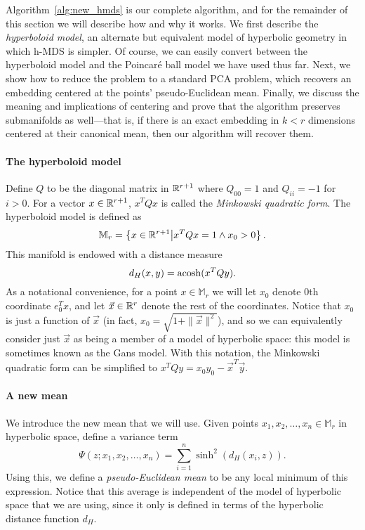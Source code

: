 Algorithm~\ref{alg:new_hmds} is our complete algorithm, and for the remainder of
this section we will describe how and why it works.
We first describe the \emph{hyperboloid model}, an alternate but equivalent model of hyperbolic geometry in which h-MDS is simpler. Of course, we can easily convert between the hyperboloid model and the Poincar\'{e} ball model we have used thus far.
Next, we show how to reduce the problem to a standard PCA problem, which recovers an embedding centered at the points' pseudo-Euclidean mean.
Finally, we discuss the meaning and implications of centering and prove that the algorithm preserves submanifolds as well---that is, if there is an exact embedding in $k < r$ dimensions centered at their canonical mean,
then our algorithm will recover them.

\paragraph*{The hyperboloid model}
Define $Q$ to be the diagonal matrix in $\mathbb{R}^{r+1}$ where $Q_{00} = 1$ and $Q_{ii} = -1$ for $i > 0$.
For a vector $x \in \mathbb{R}^{r+1}$, $x^TQx$ is called the \emph{Minkowski quadratic form}.
The hyperboloid model is defined as
\[
  \mathbb{M}_r = \left\{ x \in \mathbb{R}^{r+1} \middle| x^T Q x = 1 \land x_0 > 0 \right\}.
\]
This manifold is endowed with a distance measure
\[
  d_H(x, y) = \operatorname{acosh}(x^T Q y).
\]
As a notational convenience, for a point $x \in \mathbb{M}_r$ we will let $x_0$ denote $0$th coordinate $e_0^T x$, and let $\vec x \in \mathbb{R}^r$ denote the rest of the coordinates.
Notice that $x_0$ is just a function of $\vec x$ (in fact, $x_0 = \sqrt{1 + \| \vec{x} \|^2}$), and so we can equivalently consider just $\vec x$ as being a member of a model of hyperbolic space: this model is sometimes known as the Gans model.
With this notation, the Minkowski quadratic form can be simplified to $x^T Q y = x_0 y_0 - \vec{x}^T \vec{y}$.

\paragraph*{A new mean}
We introduce the new mean that we will use.
Given points $x_1, x_2, \ldots, x_n \in \mathbb{M}_r$ in hyperbolic space,
define a variance term
\[
  \Psi(z; x_1, x_2, \ldots, x_n)
  =
  \sum_{i=1}^n \sinh^2(d_H(x_i, z)).
\]
Using this, we define a \emph{pseudo-Euclidean mean} to be any local minimum of this expression.
Notice that this average is independent of the model of hyperbolic space that we are using, since it only is defined in terms of the hyperbolic distance function $d_H$.

